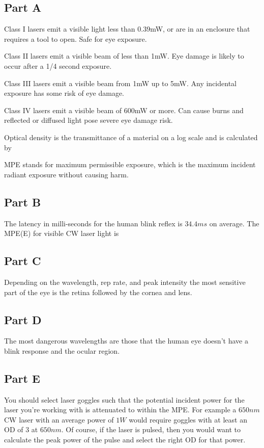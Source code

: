 \subsection*{Part A}
Class I lasers emit a visible light less than 0.39mW, or are in an enclosure that requires a tool to open. Safe for eye exposure.

Class II lasers emit a visible beam of less than 1mW. Eye damage is likely to occur after a 1/4 second exposure.

Class III lasers emit a visible beam from 1mW up to 5mW. Any incidental exposure has some risk of eye damage.

Class IV lasers emit a visible beam of 600mW or more. Can cause burns and reflected or diffused light pose severe eye damage risk.

Optical density is the transmittance of a material on a log scale and is calculated by

MPE stands for maximum permissible exposure, which is the maximum incident radiant exposure without causing harm.

\subsection*{Part B}
The latency in milli-seconds for the human blink reflex is $34.4ms$ on average. The MPE(E) for visible CW laser light is

\subsection*{Part C}
Depending on the wavelength, rep rate, and peak intensity the most sensitive part of the eye is the retina followed by the cornea and lens.

\subsection*{Part D}
The most dangerous wavelengths are those that the human eye doesn't have a blink response and the ocular region.

\subsection*{Part E}
You should select laser goggles such that the potential incident power for the laser you're working with is attenuated to within the MPE. For example a $650nm$ CW laser with an average power of $1W$ would require goggles with at least an OD of $3$ at $650nm$. Of course, if the laser is pulsed, then you would want to calculate the peak power of the pulse and select the right OD for that power. 

